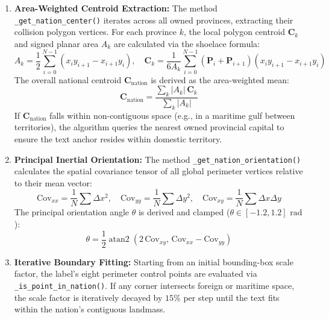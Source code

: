 \begin{enumerate}
    \item \textbf{Area-Weighted Centroid Extraction:} The method \texttt{\_get\_nation\_center()} iterates across all owned provinces, extracting their collision polygon vertices. For each province $k$, the local polygon centroid $\mathbf{C}_k$ and signed planar area $A_k$ are calculated via the shoelace formula:
    \begin{equation}
        A_k = \frac{1}{2} \sum_{i=0}^{N-1} (x_i y_{i+1} - x_{i+1} y_i), \quad \mathbf{C}_k = \frac{1}{6 A_k} \sum_{i=0}^{N-1} (\mathbf{P}_i + \mathbf{P}_{i+1})(x_i y_{i+1} - x_{i+1} y_i)
    \end{equation}
    The overall national centroid $\mathbf{C}_{\text{nation}}$ is derived as the area-weighted mean:
    \begin{equation}
        \mathbf{C}_{\text{nation}} = \frac{\sum_k |A_k| \, \mathbf{C}_k}{\sum_k |A_k|}
    \end{equation}
    If $\mathbf{C}_{\text{nation}}$ falls within non-contiguous space (e.g., in a maritime gulf between territories), the algorithm queries the nearest owned provincial capital to ensure the text anchor resides within domestic territory.
    \item \textbf{Principal Inertial Orientation:} The method \texttt{\_get\_nation\_orientation()} calculates the spatial covariance tensor of all global perimeter vertices relative to their mean vector:
    \begin{equation}
        \text{Cov}_{xx} = \frac{1}{N}\sum \Delta x^2, \quad \text{Cov}_{yy} = \frac{1}{N}\sum \Delta y^2, \quad \text{Cov}_{xy} = \frac{1}{N}\sum \Delta x \Delta y
    \end{equation}
    The principal orientation angle $\theta$ is derived and clamped ($\theta \in [-1.2, 1.2]\text{ rad}$):
    \begin{equation}
        \theta = \frac{1}{2} \operatorname{atan2}(2 \, \text{Cov}_{xy}, \, \text{Cov}_{xx} - \text{Cov}_{yy})
    \end{equation}
    \item \textbf{Iterative Boundary Fitting:} Starting from an initial bounding-box scale factor, the label's eight perimeter control points are evaluated via \texttt{\_is\_point\_in\_nation()}. If any corner intersects foreign or maritime space, the scale factor is iteratively decayed by $15\%$ per step until the text fits within the nation's contiguous landmass.
\end{enumerate}

